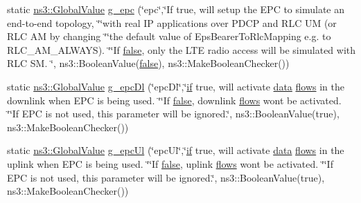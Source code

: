 \begin{DoxyCompactItemize}
\item 
static \hyperlink{classns3_1_1GlobalValue}{ns3\+::\+Global\+Value} \hyperlink{lena-dual-stripe_8cc_a798fe59724c3c39d7af3081cd2c1e56c}{g\+\_\+epc} (\char`\"{}epc\char`\"{},\char`\"{}If true, will setup the E\+PC to simulate an end-\/to-\/end topology, \char`\"{}\char`\"{}with real IP applications over P\+D\+CP and R\+LC UM (or R\+LC AM by changing \char`\"{}\char`\"{}the default value of Eps\+Bearer\+To\+Rlc\+Mapping e.\+g. to R\+L\+C\+\_\+\+A\+M\+\_\+\+A\+L\+W\+A\+YS). \char`\"{}\char`\"{}If \hyperlink{lte__cqi__generation_8m_ab1bef239d413c4da139c4bac92cd657a}{false}, only the L\+TE radio access will be simulated with R\+LC S\+M. \char`\"{}, ns3\+::\+Boolean\+Value(\hyperlink{lte__cqi__generation_8m_ab1bef239d413c4da139c4bac92cd657a}{false}), ns3\+::\+Make\+Boolean\+Checker())
\item 
static \hyperlink{classns3_1_1GlobalValue}{ns3\+::\+Global\+Value} \hyperlink{lena-dual-stripe_8cc_a9a55e10db14ae8de0f8a99e39217c7e5}{g\+\_\+epc\+Dl} (\char`\"{}epc\+Dl\char`\"{},\char`\"{}\hyperlink{loss__OH__large__cities__urban_8m_ac77b6cfa3068152087725fe54b4ae8c8}{if} true, will activate \hyperlink{topology-example-sim_8cc_a26c65296e316af77b787dc77469bb2a4}{data} \hyperlink{visualizer-ideas_8txt_af5406187248505d2f882ff6cfadfc309}{flows} in the downlink when E\+PC is being used. \char`\"{}\char`\"{}If \hyperlink{lte__cqi__generation_8m_ab1bef239d413c4da139c4bac92cd657a}{false}, downlink \hyperlink{visualizer-ideas_8txt_af5406187248505d2f882ff6cfadfc309}{flows} won\textquotesingle{}t be activated. \char`\"{}\char`\"{}If E\+PC is not used, this parameter will be ignored.\char`\"{}, ns3\+::\+Boolean\+Value(true), ns3\+::\+Make\+Boolean\+Checker())
\item 
static \hyperlink{classns3_1_1GlobalValue}{ns3\+::\+Global\+Value} \hyperlink{lena-dual-stripe_8cc_a50e951d7ab7ce99b1ba441fed4c676ac}{g\+\_\+epc\+Ul} (\char`\"{}epc\+Ul\char`\"{},\char`\"{}\hyperlink{loss__OH__large__cities__urban_8m_ac77b6cfa3068152087725fe54b4ae8c8}{if} true, will activate \hyperlink{topology-example-sim_8cc_a26c65296e316af77b787dc77469bb2a4}{data} \hyperlink{visualizer-ideas_8txt_af5406187248505d2f882ff6cfadfc309}{flows} in the uplink when E\+PC is being used. \char`\"{}\char`\"{}If \hyperlink{lte__cqi__generation_8m_ab1bef239d413c4da139c4bac92cd657a}{false}, uplink \hyperlink{visualizer-ideas_8txt_af5406187248505d2f882ff6cfadfc309}{flows} won\textquotesingle{}t be activated. \char`\"{}\char`\"{}If E\+PC is not used, this parameter will be ignored.\char`\"{}, ns3\+::\+Boolean\+Value(true), ns3\+::\+Make\+Boolean\+Checker())

\end{DoxyCompactItemize}
